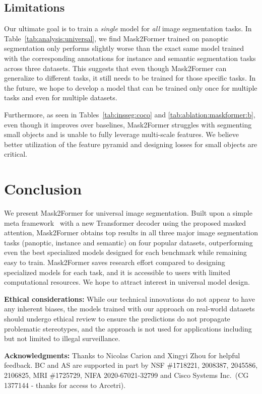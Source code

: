 \documentclass[10pt,twocolumn,letterpaper]{article}
\newcommand{\modelname}{Mask2Former\xspace}
\newcommand{\tabref}[1]{Table~\ref{#1}}
\begin{document}
\subsection{Limitations}
Our ultimate goal is to train a {\em single} model for \emph{all} image segmentation tasks. In \tabref{tab:analysis:universal}, we find \modelname trained on panoptic segmentation only performs slightly worse than the exact same model trained with the corresponding annotations for instance and semantic segmentation tasks across three datasets.
This suggests that even though \modelname can generalize to different tasks, it still needs to be trained for those specific tasks.
In the future, we hope to develop a model that can be trained only once for multiple tasks and even for multiple datasets.

Furthermore, as seen in Tables~\ref{tab:insseg:coco} and \ref{tab:ablation:maskformer:b}, even though it improves over baselines, \modelname struggles with segmenting small objects and is unable to fully leverage multi-scale features. We believe better utilization of the feature pyramid and designing losses for small objects are critical.



















 \section{Conclusion}
We present \modelname for universal image segmentation. Built upon a simple meta framework~\cite{cheng2021maskformer} with a new Transformer decoder using the proposed masked attention, \modelname obtains top results in all three major image segmentation tasks (panoptic, instance and semantic) on four popular datasets, outperforming even the best specialized models designed for each benchmark while remaining easy to train. \modelname saves  research effort compared to designing specialized models for each task, and it is accessible to users with limited computational resources. We hope to attract interest in universal model design.  
{
\footnotesize
{\bf \noindent Ethical considerations:} 
While our technical innovations do not appear to have any inherent biases, the models trained with our approach on real-world datasets should undergo ethical review to ensure the predictions do not propagate problematic stereotypes, and the approach is not used for applications including but not limited to illegal surveillance.

\noindent\textbf{Acknowledgments:} Thanks to Nicolas Carion and Xingyi Zhou for helpful feedback. BC and AS are supported in part by NSF \#1718221, 2008387, 2045586, 2106825, MRI \#1725729, NIFA 2020-67021-32799 and Cisco Systems Inc.\ (CG 1377144 - thanks for access to Arcetri).
}
\end{document}
